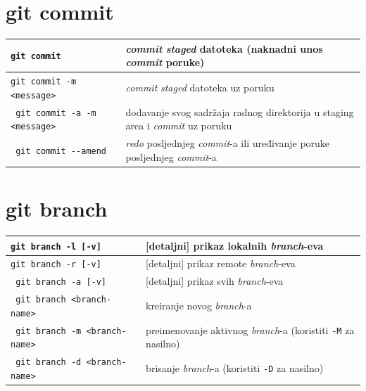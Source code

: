 \documentclass[10pt]{article}
\begin{document}
    \section*{\color{BrickRed} git commit}
    \begin{tabular}{|>{\tt}p{9.25cm}|>{}p{15.50cm}|}
        \hline
        git commit                                          & \textit{commit} \textit{staged} datoteka (naknadni unos \textit{commit} poruke) \\ \hline
        git commit -m <message>                             & \textit{commit} \textit{staged} datoteka uz poruku \\ \hline
        git commit -a -m <message>                          & dodavanje svog sadržaja radnog direktorija u staging area i \textit{commit} uz poruku \\ \hline
        git commit -{}-amend                                & \textit{redo} posljednjeg \textit{commit}-a ili uređivanje poruke posljednjeg \textit{commit}-a \\ \hline
    \end{tabular}

    \section*{\color{BrickRed} git branch}
    \begin{tabular}{|>{\tt}p{9.25cm}|>{}p{15.50cm}|}
        \hline
        git branch -l [-v]                              & [detaljni] prikaz lokalnih \textit{branch}-eva \\ \hline
        git branch -r [-v]                              & [detaljni] prikaz remote \textit{branch}-eva \\ \hline
        git branch -a [-v]                              & [detaljni] prikaz svih \textit{branch}-eva \\ \hline
        git branch <branch-name>                        & kreiranje novog \textit{branch}-a \\ \hline
        git branch -m <branch-name>                     & preimenovanje aktivnog \textit{branch}-a (koristiti \texttt{-M} za nasilno) \\ \hline
        git branch -d <branch-name>                     & brisanje \textit{branch}-a (koristiti \texttt{-D} za nasilno) \\ \hline
    \end{tabular}
\end{document}
